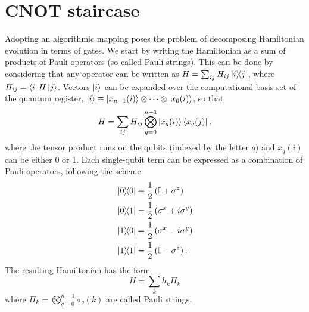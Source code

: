\documentclass[12pt, amsmath, amssymb, graphicx]{iopart}
\begin{document}
\section{CNOT staircase} \label{app:CNOT-staircase}
Adopting an algorithmic mapping poses the problem of decomposing Hamiltonian evolution in terms of gates.
We start by writing the Hamiltonian as a sum of products of Pauli operators (so-called Pauli strings).
This can be done by considering that any operator can be written as $H = \sum_{ij} H_{ij} \ketbra{i}{j}$, where $H_{ij} = \bra{i} H \ket{j}$.
Vectors $\ket{i}$ can be expanded over the computational basis set of the quantum register, $\ket{i} \equiv \ket{x_{n-1}(i)} \otimes \dots \otimes \ket{x_0(i)}$, so that 
\begin{equation}
    H = \sum_{ij} H_{ij} \bigotimes_{q=0}^{n-1} \ket{x_q(i)}\bra{x_q(j)},
\end{equation}
where the tensor product runs on the qubits (indexed by the letter $q$) and $x_q(i)$ can be either 0 or 1.
Each single-qubit term can be expressed as a combination of Pauli operators, following the scheme
%
\begin{equation}
    \begin{split}
        &\ketbra{0} = \frac{1}{2} \left( \mathbb{I} + \sigma^z \right) \\
        &\ketbra{0}{1} = \frac{1}{2} \left( \sigma^x + i\sigma^y \right) \\
        &\ketbra{1}{0} = \frac{1}{2} \left( \sigma^x - i\sigma^y \right) \\
        &\ketbra{1} = \frac{1}{2} \left( \mathbb{I} - \sigma^z \right). \\
    \end{split}
\end{equation}
%
The resulting Hamiltonian has the form
%
\begin{equation} \label{app_eq:pauli_string_H}
    H = \sum_{k} h_k \Pi_k
\end{equation}
%
where $\Pi_k = \bigotimes_{q=0}^{n-1} \sigma_q (k)$ are called Pauli strings.
\end{document}

